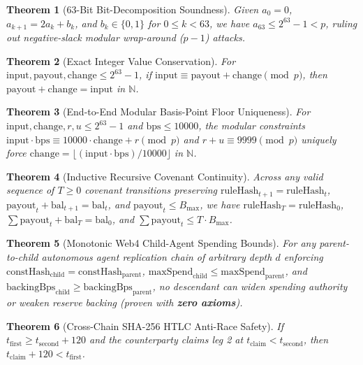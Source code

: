 \documentclass[11pt,a4paper]{article}
\newtheorem{theorem}{Theorem}
\begin{document}
\begin{theorem}[63-Bit Bit-Decomposition Soundness]
Given $a_0 = 0$, $a_{k+1} = 2a_k + b_k$, and $b_k \in \{0,1\}$ for $0 \le k < 63$, we have $a_{63} \le 2^{63}-1 < p$, ruling out negative-slack modular wrap-around ($p-1$) attacks.
\end{theorem}

\begin{theorem}[Exact Integer Value Conservation]
For $\mathrm{input}, \mathrm{payout}, \mathrm{change} \le 2^{63}-1$, if $\mathrm{input} \equiv \mathrm{payout} + \mathrm{change} \pmod p$, then $\mathrm{payout} + \mathrm{change} = \mathrm{input}$ in $\mathbb{N}$.
\end{theorem}

\begin{theorem}[End-to-End Modular Basis-Point Floor Uniqueness]
For $\mathrm{input}, \mathrm{change}, r, u \le 2^{63}-1$ and $\mathrm{bps} \le 10000$, the modular constraints $\mathrm{input}\cdot\mathrm{bps} \equiv 10000\cdot\mathrm{change} + r \pmod p$ and $r + u \equiv 9999 \pmod p$ uniquely force $\mathrm{change} = \lfloor (\mathrm{input}\cdot\mathrm{bps})/10000 \rfloor$ in $\mathbb{N}$.
\end{theorem}

\begin{theorem}[Inductive Recursive Covenant Continuity]
Across any valid sequence of $T \ge 0$ covenant transitions preserving $\mathrm{ruleHash}_{t+1} = \mathrm{ruleHash}_t$, $\mathrm{payout}_t + \mathrm{bal}_{t+1} = \mathrm{bal}_t$, and $\mathrm{payout}_t \le B_{\max}$, we have $\mathrm{ruleHash}_T = \mathrm{ruleHash}_0$, $\sum \mathrm{payout}_t + \mathrm{bal}_T = \mathrm{bal}_0$, and $\sum \mathrm{payout}_t \le T \cdot B_{\max}$.
\end{theorem}

\begin{theorem}[Monotonic Web4 Child-Agent Spending Bounds]
For any parent-to-child autonomous agent replication chain of arbitrary depth $d$ enforcing $\mathrm{constHash}_{\text{child}} = \mathrm{constHash}_{\text{parent}}$, $\mathrm{maxSpend}_{\text{child}} \le \mathrm{maxSpend}_{\text{parent}}$, and $\mathrm{backingBps}_{\text{child}} \ge \mathrm{backingBps}_{\text{parent}}$, no descendant can widen spending authority or weaken reserve backing (proven with \textbf{zero axioms}).
\end{theorem}

\begin{theorem}[Cross-Chain SHA-256 HTLC Anti-Race Safety]
If $t_{\text{first}} \ge t_{\text{second}} + 120$ and the counterparty claims leg 2 at $t_{\text{claim}} < t_{\text{second}}$, then $t_{\text{claim}} + 120 < t_{\text{first}}$.
\end{theorem}
\end{document}

